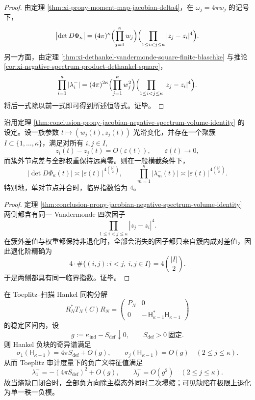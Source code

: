 \begin{proof}
由定理 \ref{thm:xi-prony-moment-map-jacobian-delta4}，在 \(\omega_j=4\pi w_j\) 的记号下，
\[
\bigl|\det D\Phi_\kappa\bigr|
=(4\pi)^\kappa
\Bigl(\prod_{j=1}^{\kappa}w_j\Bigr)
\Bigl(\prod_{1\le i<j\le \kappa}|z_j-z_i|^4\Bigr).
\]
另一方面，由定理 \ref{thm:xi-dethankel-vandermonde-square-finite-blaschke} 与推论 \ref{cor:xi-negative-spectrum-product-dethankel-square}，
\[
\prod_{i=1}^{\kappa}|\lambda_i^-|
=(4\pi)^{2\kappa}
\Bigl(\prod_{j=1}^{\kappa}w_j^2\Bigr)
\Bigl(\prod_{1\le i<j\le \kappa}|z_j-z_i|^4\Bigr).
\]
将后一式除以前一式即可得到所述恒等式。证毕。
\end{proof}

\begin{corollary}[节点并合的四次判别指数律]\label{cor:conclusion-node-coalescence-quartic-discriminant-law}
沿用定理 \ref{thm:conclusion-prony-jacobian-negative-spectrum-volume-identity} 的设定。设一族参数 \(t\mapsto (w_j(t),z_j(t))\) 光滑变化，并存在一个聚簇 \(I\subset\{1,\dots,\kappa\}\)，满足对所有 \(i,j\in I\),
\[
z_i(t)-z_j(t)=O(\varepsilon(t)),
\qquad
\varepsilon(t)\to 0,
\]
而簇外节点差与全部权重保持远离零。则在一般横截条件下，
\[
\bigl|\det D\Phi_\kappa(t)\bigr|
\asymp
|\varepsilon(t)|^{\,4\binom{|I|}{2}},
\qquad
\prod_{m=1}^{\kappa}|\lambda_m^-(t)|
\asymp
|\varepsilon(t)|^{\,4\binom{|I|}{2}}.
\]
特别地，单对节点并合时，临界指数恰为 \(4\)。
\end{corollary}

\begin{proof}
定理 \ref{thm:conclusion-prony-jacobian-negative-spectrum-volume-identity} 两侧都含有同一 Vandermonde 四次因子
\[
\prod_{1\le i<j\le \kappa}|z_j-z_i|^4.
\]
在簇外差值与权重都保持非退化时，全部会消失的因子都只来自簇内成对差值，因此退化阶精确为
\[
4\cdot \#\{(i,j):i<j,\ i,j\in I\}
=
4\binom{|I|}{2}.
\]
于是两侧都具有同一临界指数。证毕。
\end{proof}

\begin{theorem}[熵缺口趋零时负子空间的秩一塌缩]\label{thm:conclusion-entropy-gap-rankone-negative-collapse}
在 Toeplitz--扫描 Hankel 同构分解
\[
R_N^\ast T_N(C)R_N=
\begin{pmatrix}
P_N & 0\\
0 & -\,\mathsf H_{\kappa-1}^\ast\mathsf H_{\kappa-1}
\end{pmatrix}
\]
的稳定区间内，设
\[
g:=\kappa_{\mathrm{ind}}-S_{\mathrm{def}}\downarrow 0,
\qquad
S_{\mathrm{def}}>0\ \text{固定}.
\]
则 Hankel 负块的奇异谱满足
\[
\sigma_1(\mathsf H_{\kappa-1})=4\pi S_{\mathrm{def}}+O(g),
\qquad
\sigma_j(\mathsf H_{\kappa-1})=O(g)\quad(2\le j\le \kappa).
\]
从而 Toeplitz 审计度量下的负广义特征值满足
\[
\lambda_1^-=
-(4\pi S_{\mathrm{def}})^2+O(g),
\qquad
\lambda_j^-=O(g^2)\quad(2\le j\le \kappa).
\]
故当熵缺口闭合时，全部负方向除主模态外同时二次塌缩；可见缺陷在极限上退化为单一秩一负模。
\end{theorem}

